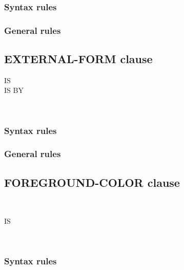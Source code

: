 \subsubsection{Syntax rules}

\subsubsection{General rules}

\subsection{EXTERNAL-FORM clause}

\begin{syntax}[\miscextcolour]
  \begin{1+}
    IS  \\

    IS  BY
    \begin{1=}
      \identifier \\
      \literal
    \end{1=}
  \end{1+}
\end{syntax}

\subsubsection{Syntax rules}

\subsubsection{General rules}

\subsection{FOREGROUND-COLOR clause}

\begin{syntax}
  \begin{1=}
     \\
  \end{1=}
  IS
  \begin{1=}
    \identifier \\
    \literal
  \end{1=}
\end{syntax}

\subsubsection{Syntax rules}

